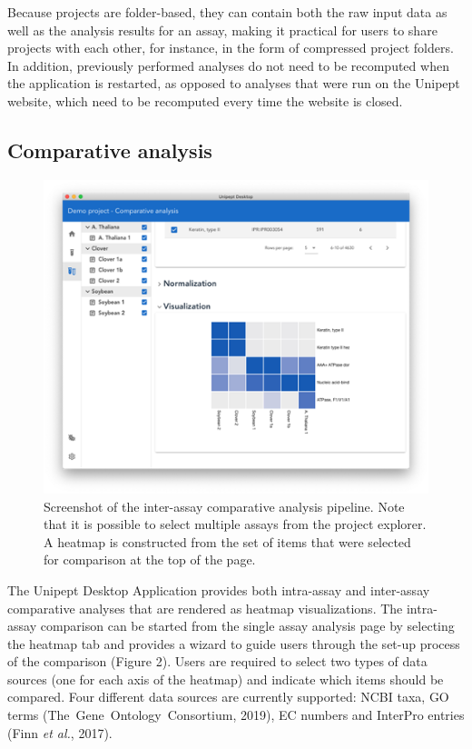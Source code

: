 Because projects are folder-based, they can contain both the raw input
data as well as the analysis results for an assay, making it practical
for users to share projects with each other, for instance, in the form
of compressed project folders. In addition, previously performed
analyses do not need to be recomputed when the application is restarted,
as opposed to analyses that were run on the Unipept website, which need
to be recomputed every time the website is closed.

\hypertarget{comparative-analysis}{%
\subsection{Comparative analysis}\label{comparative-analysis}}

\begin{figure}
\centering
\includegraphics{resources/figures/chapter2_comparative_analysis_screenshot.png}
\caption{Screenshot of the inter-assay comparative analysis pipeline.
Note that it is possible to select multiple assays from the project
explorer. A heatmap is constructed from the set of items that were
selected for comparison at the top of the page.}
\end{figure}

The Unipept Desktop Application provides both intra-assay and
inter-assay comparative analyses that are rendered as heatmap
visualizations. The intra-assay comparison can be started from the
single assay analysis page by selecting the heatmap tab and provides a
wizard to guide users through the set-up process of the comparison
(Figure 2). Users are required to select two types of data sources (one
for each axis of the heatmap) and indicate which items should be
compared. Four different data sources are currently supported: NCBI
taxa, GO terms (The~Gene~Ontology~Consortium, 2019), EC numbers and
InterPro entries (Finn \emph{et al.}, 2017).

